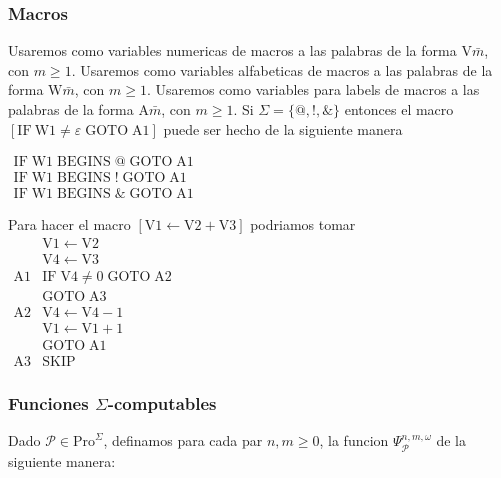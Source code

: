 \subsubsection{Macros}

Usaremos como variables numericas de macros a las palabras de la forma \( \mathrm{V}\bar{m}\), con \(m\geq 1.\) Usaremos como variables alfabeticas de macros a las palabras de la forma \(\mathrm{W}\bar{m}\), con \(m\geq 1.\) Usaremos como variables para labels de macros a las palabras de la forma \( \mathrm{A}\bar{m}\), con \(m\geq 1\). Si \(\Sigma =\{@,!,\& \}\) entonces el macro \(\left[ \mathrm{IF\ W}1\neq \varepsilon \;\mathrm{GOTO}\;\mathrm{A}1\right] \) puede ser hecho de la siguiente manera

\(\displaystyle \begin{array}{l} \mathrm{IF}\;\mathrm{W}1\;\mathrm{BEGINS}\;@\;\mathrm{GOTO}\;\mathrm{A}1 \\ \mathrm{IF}\;\mathrm{W}1\;\mathrm{BEGINS}\;!\;\mathrm{GOTO}\;\mathrm{A}1 \\ \mathrm{IF}\;\mathrm{W}1\;\mathrm{BEGINS}\;\& \;\mathrm{GOTO}\;\mathrm{A}1 \end{array} \)

Para hacer el macro \(\left[ \mathrm{V}1\leftarrow \mathrm{V}2+\mathrm{V}3 \right] \) podriamos tomar
\(\displaystyle \begin{array}{ll} & \mathrm{V}1\leftarrow \mathrm{V}2 \\ & \mathrm{V}4\leftarrow \mathrm{V}3 \\ \mathrm{A}1 & \mathrm{IF}\;\mathrm{V}4\neq 0\;\mathrm{GOTO}\;\mathrm{A}2 \\ & \mathrm{GOTO}\;\mathrm{A}3 \\ \mathrm{A}2 & \mathrm{V}4\leftarrow \mathrm{V}4-1 \\ & \mathrm{V}1\leftarrow \mathrm{V}1+1 \\ & \mathrm{GOTO}\;\mathrm{A}1 \\ \mathrm{A}3 & \mathrm{SKIP} \end{array} \)



\subsubsection{Funciones \(\Sigma \)-computables}

Dado \(\mathcal{P}\in \mathrm{Pro}^{\Sigma }\), definamos para cada par \( n,m\geq 0\), la funcion \(\Psi _{\mathcal{P}}^{n,m,\omega }\) de la siguiente manera:

